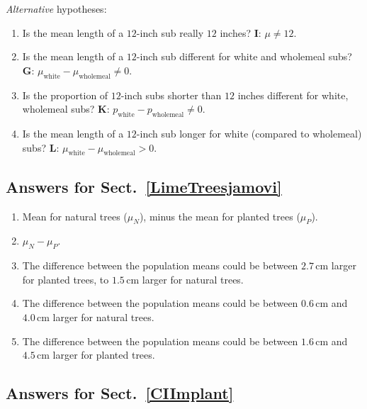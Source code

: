\documentclass[
  11pt,
  a4paper,
  krantz2]{krantz}
\providecommand{\tightlist}{%
  \setlength{\itemsep}{0pt}\setlength{\parskip}{0pt}}
\begin{document}
\begin{footnotesize}
\emph{Alternative} hypotheses:

\begin{enumerate}
\def\labelenumi{\arabic{enumi}.}
\tightlist
\item
  Is the mean length of a \(12\)-inch sub really \(12\) inches?
  \textbf{I}: \(\mu \ne 12\).
\item
  Is the mean length of a \(12\)-inch sub different for white and wholemeal subs?
  \textbf{G}: \(\mu_{\text{white}} - \mu_{\text{wholemeal}} \ne  0\).
\item
  Is the proportion of \(12\)-inch subs shorter than \(12\) inches different for white, wholemeal subs?
  \textbf{K}: \(p_{\text{white}} - p_{\text{wholemeal}}\ne 0\).
\item
  Is the mean length of a \(12\)-inch sub longer for white (compared to wholemeal) subs?
  \textbf{L}: \(\mu_{\text{white}} - \mu_{\text{wholemeal}} > 0\).
\end{enumerate}

\subsection*{Answers for Sect.~\ref{LimeTreesjamovi}}\label{answers-for-sect.-reflimetreesjamovi}

\begin{enumerate}
\def\labelenumi{\arabic{enumi}.}
\tightlist
\item
  Mean for natural trees (\(\mu_N\)), minus the mean for planted trees (\(\mu_P\)).
\item
  \(\mu_N - \mu_P\).
\item
  The difference between the population means could be between \(2.7\,\text{cm}\) larger for planted trees, to \(1.5\,\text{cm}\) larger for natural trees.
\item
  The difference between the population means could be between \(0.6\,\text{cm}\) and \(4.0\,\text{cm}\) larger for natural trees.
\item
  The difference between the population means could be between \(1.6\,\text{cm}\) and \(4.5\,\text{cm}\) larger for planted trees.
\end{enumerate}

\subsection*{Answers for Sect.~\ref{CIImplant}}\label{answers-for-sect.-refciimplant}


\end{footnotesize}
\end{document}
